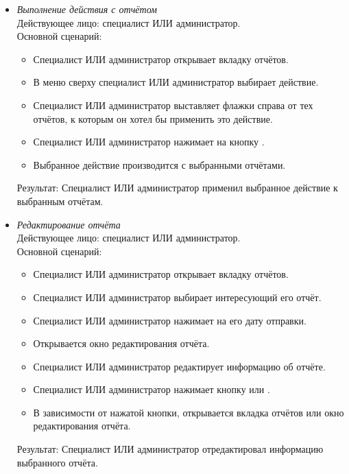 \begin{itemize}[topsep=0pt, parsep=0pt, itemsep=0pt, leftmargin=*, labelindent=0.5cm]
	\item \textit{Выполнение действия с отчётом} \\
	Действующее лицо: специалист ИЛИ администратор. \\
	Основной сценарий:
	\begin{itemize}[topsep=0pt, parsep=0pt, itemsep=0pt, leftmargin=*, labelindent=0.5cm]
		\item Специалист ИЛИ администратор открывает вкладку отчётов.
		\item В меню сверху специалист ИЛИ администратор выбирает действие.
		\item Специалист ИЛИ администратор выставляет флажки справа от тех отчётов, к которым он хотел бы применить это действие.
		\item Специалист ИЛИ администратор нажимает на кнопку .
		\item Выбранное действие производится с выбранными отчётами.
	\end{itemize}
	Результат: Специалист ИЛИ администратор применил выбранное действие к выбранным отчётам.
\end{itemize}

\begin{itemize}[topsep=0pt, parsep=0pt, itemsep=0pt, leftmargin=*, labelindent=0.5cm]
	\item \textit{Редактирование отчёта} \\
	Действующее лицо: специалист ИЛИ администратор. \\
	Основной сценарий:
	\begin{itemize}[topsep=0pt, parsep=0pt, itemsep=0pt, leftmargin=*, labelindent=0.5cm]
		\item Специалист ИЛИ администратор открывает вкладку отчётов.
		\item Специалист ИЛИ администратор выбирает интересующий его отчёт.
		\item Специалист ИЛИ администратор нажимает на его дату отправки.
		\item Открывается окно редактирования отчёта.
		\item Специалист ИЛИ администратор редактирует информацию об отчёте.
		\item Специалист ИЛИ администратор нажимает кнопку  или .
		\item В зависимости от нажатой кнопки, открывается вкладка отчётов или окно редактирования отчёта.
	\end{itemize}
	Результат: Специалист ИЛИ администратор отредактировал информацию выбранного отчёта.
\end{itemize}

